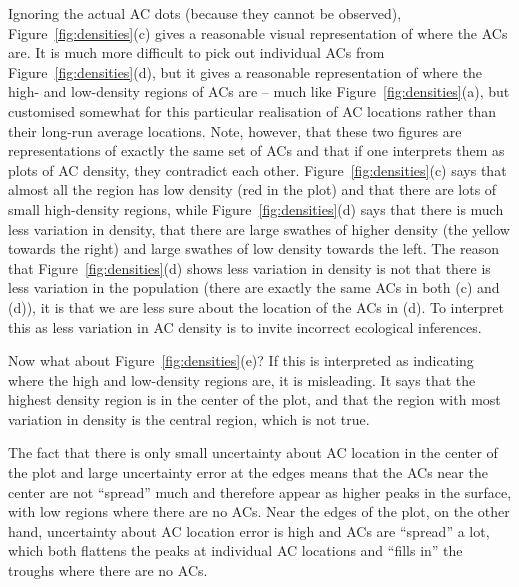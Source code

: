 \documentclass[useAMS,usenatbib,referee]{biom}
\begin{document}
Ignoring the actual AC dots (because they cannot be observed), Figure~\ref{fig:densities}(c) gives a reasonable visual representation of where the ACs are. It is much more difficult to pick out individual ACs from Figure~\ref{fig:densities}(d), but it gives a reasonable representation of where the high- and low-density regions of ACs are -- much like Figure~\ref{fig:densities}(a), but customised somewhat for this particular realisation of AC locations rather than their long-run average locations. Note, however, that these two figures are representations of exactly the same set of ACs and that if one interprets them as plots of AC density, they contradict each other. Figure~\ref{fig:densities}(c) says that almost all the region has low density (red in the plot) and that there are lots of small high-density regions, while Figure~\ref{fig:densities}(d) says that there is much less variation in density, that there are large swathes of higher density (the yellow towards the right) and large swathes of low density towards the left. The reason that Figure~\ref{fig:densities}(d) shows less variation in density is not that there is less variation in the population (there are exactly the same ACs in both (c) and (d)), it is that we are less sure about the location of the ACs in (d). To interpret this as less variation in AC density is to invite incorrect ecological inferences.

Now what about Figure~\ref{fig:densities}(e)? If this is interpreted as indicating where the high and low-density regions are, it is misleading. It says that the highest density region is in the center of the plot, and that the region with most variation in density is the central region, which is not true. 

The fact that there is only small uncertainty about AC location in the center of the plot and large uncertainty error at the edges means that the ACs near the center are not ``spread'' much and therefore appear as higher peaks in the surface, with low regions where there are no ACs. Near the edges of the plot, on the other hand, uncertainty about AC location error is high and ACs are ``spread'' a lot, which both flattens the peaks at individual AC locations and ``fills in'' the troughs where there are no ACs. %

\end{document}
